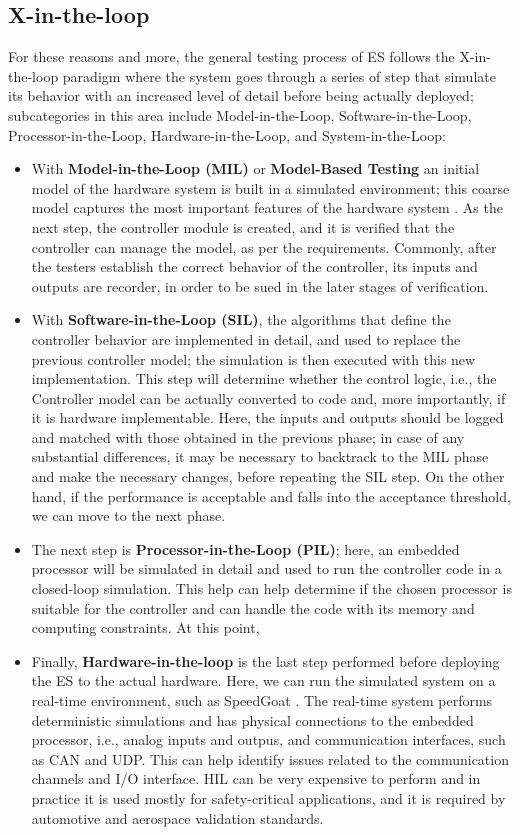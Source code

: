 \subsection{X-in-the-loop}
For these reasons and more, the general testing process of ES follows the X-in-the-loop paradigm \cite{DBLP:journals/software/GarousiFKY18} where the system goes through a series of step that simulate its behavior with an increased level of detail before being actually deployed; subcategories in this area include Model-in-the-Loop, Software-in-the-Loop, Processor-in-the-Loop, Hardware-in-the-Loop, and System-in-the-Loop:
\begin{itemize}
    \item With \textbf{Model-in-the-Loop (MIL)} or \textbf{Model-Based Testing} an initial model of the hardware system is built in a simulated environment; this coarse model captures the most important features of the hardware system \cite{XLoop}. As the next step, the controller module is created, and it is verified that the controller can manage the model, as per the requirements. Commonly, after the testers establish the correct behavior of the controller, its inputs and outputs are recorder, in order to be sued in the later stages of verification.
    \item With \textbf{Software-in-the-Loop (SIL)}, the algorithms that define the controller behavior are implemented in detail, and used to replace the previous controller model; the simulation is then executed with this new implementation. This step will determine whether the control logic, i.e., the Controller model can be actually converted to code and, more importantly, if it is hardware implementable. Here, the inputs and outputs should be logged and matched with those obtained in the previous phase; in case of any substantial differences, it may be necessary to backtrack to the MIL phase and make the necessary changes, before repeating the SIL step. On the other hand, if the performance is acceptable and falls into the acceptance threshold, we can move to the next phase.
    \item The next step is \textbf{Processor-in-the-Loop (PIL)}; here, an embedded processor will be simulated in detail and used to run the controller code in a closed-loop simulation. This help can help determine if the chosen processor is suitable for the controller and can handle the code with its memory and computing constraints. At this point, 
    \item Finally, \textbf{Hardware-in-the-loop} is the last step performed before deploying the ES to the actual hardware. Here, we can run the simulated system on a real-time environment, such as SpeedGoat \cite{SpeedGoat}. The real-time system performs deterministic simulations and has physical connections to the embedded processor, i.e., analog inputs and outpus, and communication interfaces, such as CAN and UDP. This can help identify issues related to the communication channels and I/O interface. HIL can be very expensive to perform and in practice it is used mostly for safety-critical applications, and it is required by automotive and aerospace validation standards. 
\end{itemize}

